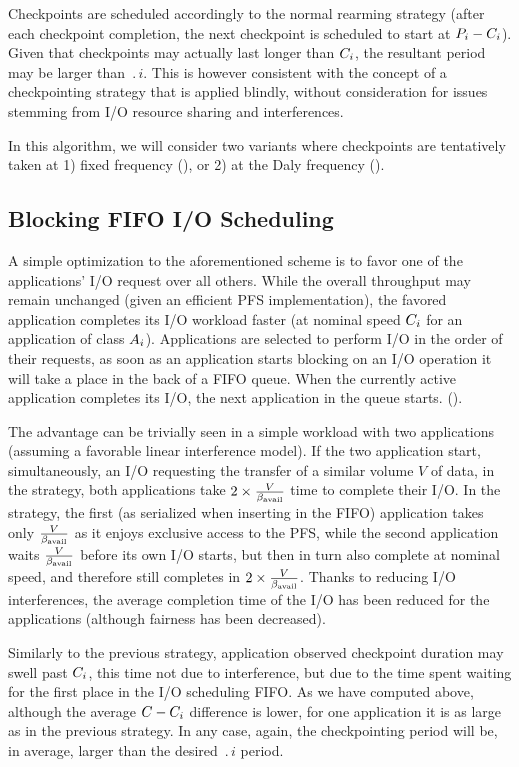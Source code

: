 Checkpoints are scheduled accordingly to the normal rearming strategy
(\ie after each checkpoint completion, the next checkpoint is scheduled
to start at $P_{i}-C_{i}$). Given that checkpoints may actually
last longer than $C_{i}$, the resultant period may be larger than
$\period{i}$. This is however consistent with the concept of a
checkpointing strategy that is applied blindly, without consideration
for issues stemming from I/O resource sharing and interferences.

In this algorithm, we will consider two variants where checkpoints are
tentatively taken at 1) fixed frequency (\propfixed), or 2) at the
Daly frequency (\propdaly).

\subsection{Blocking \fifoblock FIFO I/O Scheduling}

A simple optimization to the aforementioned scheme is to favor one of
the applications' I/O request over all others. While the overall throughput
may remain unchanged (given an efficient PFS implementation), the favored
application completes its I/O workload faster (\ie at nominal speed
$C_{i}$ for an application of class $A_{i}$).
Applications are selected to perform I/O in the order of their requests,
\ie as soon as an application starts blocking on an I/O operation it will
take a place in the back of a FIFO queue. When the currently
active application completes its I/O, the next application in  the
queue starts.
(\fifoblock).

The advantage can be trivially seen in a simple workload with two
applications (assuming a favorable linear interference model).
If the two application start, simultaneously, an I/O requesting the
transfer of a similar volume $V$ of data, in the \nocoop strategy,
both applications take $2 \times \frac{V}{\beta_{\text{avail}}}$ time to complete
their I/O. In the \fifoblock strategy, the first (as serialized when
inserting in the FIFO) application takes only $\frac{V}{\beta_{\text{avail}}}$
as it enjoys exclusive access to the PFS, while the second application
waits $\frac{V}{\beta_{\text{avail}}}$ before its own I/O starts, but then in turn
also complete at nominal speed, and therefore still completes in
$2 \times \frac{V}{\beta_{\text{avail}}}$. Thanks
to reducing I/O interferences, the average completion time of the I/O
has been reduced for the applications (although fairness has been decreased).

Similarly to the previous strategy, application observed checkpoint
duration may swell past $C_{i}$, this time not due to interference, but due to
the time spent waiting for the first place in the I/O scheduling FIFO.
As we have computed above, although the average $C-C_{i}$
difference is lower, for one application it is as large as in the
previous strategy. In any case, again, the checkpointing period will
be, in average, larger than the desired $\period{i}$ period.

